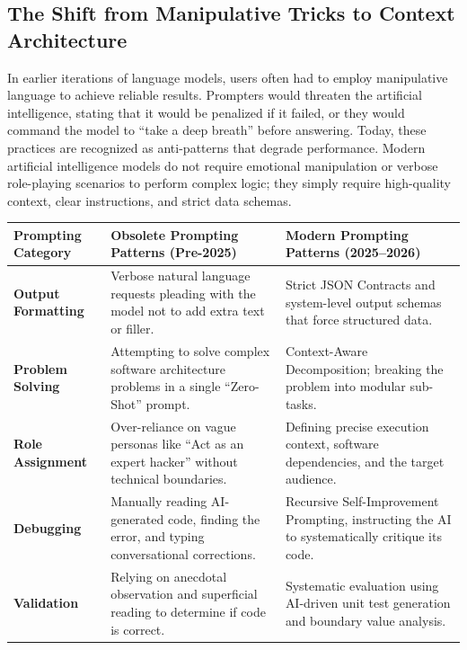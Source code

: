 \documentclass[12pt]{article}
\begin{document}
\subsection{The Shift from Manipulative Tricks to Context Architecture}
In earlier iterations of language
models, users often had to employ manipulative language to achieve reliable results. Prompters would threaten
the artificial intelligence, stating that it would be penalized if it failed, or they would command the model
to ``take a deep breath'' before answering. Today, these practices are recognized as anti-patterns that degrade
performance. Modern artificial intelligence models do not require emotional manipulation or verbose
role-playing scenarios to perform complex logic; they simply require high-quality context, clear instructions,
and strict data schemas. 

\begin{table}[h!]
\centering
\begin{tabularx}{\textwidth}{p{} X X}
\toprule
\textbf{Prompting Category} & \textbf{Obsolete Prompting Patterns (Pre-2025)} & \textbf{Modern Prompting Patterns (2025--2026)} \\
\midrule
\textbf{Output Formatting} & Verbose natural language requests pleading with the model not to add extra text or filler. & Strict JSON Contracts and system-level output schemas that force structured data. \\
\addlinespace
\textbf{Problem Solving} & Attempting to solve complex software architecture problems in a single ``Zero-Shot'' prompt. & Context-Aware Decomposition; breaking the problem into modular sub-tasks. \\ \addlinespace \textbf{Role Assignment} & Over-reliance on vague personas like ``Act as an expert hacker'' without technical boundaries. & Defining precise execution context, software dependencies, and the target audience. \\
\addlinespace
\textbf{Debugging} & Manually reading AI-generated code, finding the error, and typing conversational corrections. & Recursive Self-Improvement Prompting, instructing the AI to systematically critique its code. \\
\addlinespace
\textbf{Validation} & Relying on anecdotal observation and superficial reading to determine if code is correct. & Systematic evaluation using AI-driven unit test generation and boundary value analysis. \\
\bottomrule
\end{tabularx}
\end{table}
\end{document}
